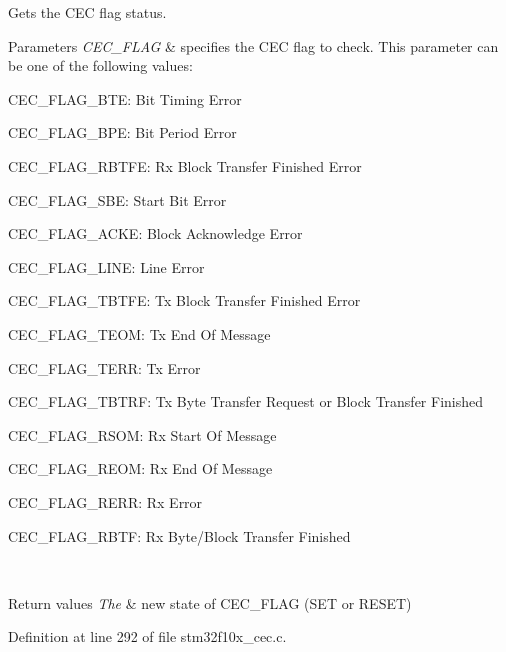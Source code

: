 Gets the C\+EC flag status. 


\begin{DoxyParams}{Parameters}
{\em C\+E\+C\+\_\+\+F\+L\+AG} & specifies the C\+EC flag to check. This parameter can be one of the following values\+: \begin{DoxyItemize}
\item C\+E\+C\+\_\+\+F\+L\+A\+G\+\_\+\+B\+TE\+: Bit Timing Error \item C\+E\+C\+\_\+\+F\+L\+A\+G\+\_\+\+B\+PE\+: Bit Period Error \item C\+E\+C\+\_\+\+F\+L\+A\+G\+\_\+\+R\+B\+T\+FE\+: Rx Block Transfer Finished Error \item C\+E\+C\+\_\+\+F\+L\+A\+G\+\_\+\+S\+BE\+: Start Bit Error \item C\+E\+C\+\_\+\+F\+L\+A\+G\+\_\+\+A\+C\+KE\+: Block Acknowledge Error \item C\+E\+C\+\_\+\+F\+L\+A\+G\+\_\+\+L\+I\+NE\+: Line Error \item C\+E\+C\+\_\+\+F\+L\+A\+G\+\_\+\+T\+B\+T\+FE\+: Tx Block Transfer Finished Error \item C\+E\+C\+\_\+\+F\+L\+A\+G\+\_\+\+T\+E\+OM\+: Tx End Of Message \item C\+E\+C\+\_\+\+F\+L\+A\+G\+\_\+\+T\+E\+RR\+: Tx Error \item C\+E\+C\+\_\+\+F\+L\+A\+G\+\_\+\+T\+B\+T\+RF\+: Tx Byte Transfer Request or Block Transfer Finished \item C\+E\+C\+\_\+\+F\+L\+A\+G\+\_\+\+R\+S\+OM\+: Rx Start Of Message \item C\+E\+C\+\_\+\+F\+L\+A\+G\+\_\+\+R\+E\+OM\+: Rx End Of Message \item C\+E\+C\+\_\+\+F\+L\+A\+G\+\_\+\+R\+E\+RR\+: Rx Error \item C\+E\+C\+\_\+\+F\+L\+A\+G\+\_\+\+R\+B\+TF\+: Rx Byte/\+Block Transfer Finished \end{DoxyItemize}
\\
\hline
\end{DoxyParams}

\begin{DoxyRetVals}{Return values}
{\em The} & new state of C\+E\+C\+\_\+\+F\+L\+AG (S\+ET or R\+E\+S\+ET) \\
\hline
\end{DoxyRetVals}


Definition at line 292 of file stm32f10x\+\_\+cec.\+c.

\mbox{\label{group___c_e_c___private___functions_gaa1940a388d0bfcefe7483fb74cc2ba1d}} 
